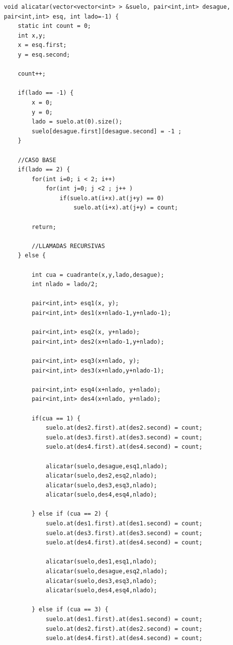 \begin{lstlisting}
void alicatar(vector<vector<int> > &suelo, pair<int,int> desague, pair<int,int> esq, int lado=-1) {
    static int count = 0;
    int x,y;
    x = esq.first;
    y = esq.second;

    count++;

    if(lado == -1) {
        x = 0;
        y = 0;
        lado = suelo.at(0).size();
        suelo[desague.first][desague.second] = -1 ;
    }

    //CASO BASE
    if(lado == 2) {
        for(int i=0; i < 2; i++)
            for(int j=0; j <2 ; j++ )
                if(suelo.at(i+x).at(j+y) == 0)
                    suelo.at(i+x).at(j+y) = count;

        return;

        //LLAMADAS RECURSIVAS
    } else {

        int cua = cuadrante(x,y,lado,desague);
        int nlado = lado/2;

        pair<int,int> esq1(x, y);
        pair<int,int> des1(x+nlado-1,y+nlado-1);

        pair<int,int> esq2(x, y+nlado);
        pair<int,int> des2(x+nlado-1,y+nlado);

        pair<int,int> esq3(x+nlado, y);
        pair<int,int> des3(x+nlado,y+nlado-1);

        pair<int,int> esq4(x+nlado, y+nlado);
        pair<int,int> des4(x+nlado, y+nlado);

        if(cua == 1) {
            suelo.at(des2.first).at(des2.second) = count;
            suelo.at(des3.first).at(des3.second) = count;
            suelo.at(des4.first).at(des4.second) = count;

            alicatar(suelo,desague,esq1,nlado);
            alicatar(suelo,des2,esq2,nlado);
            alicatar(suelo,des3,esq3,nlado);
            alicatar(suelo,des4,esq4,nlado);

        } else if (cua == 2) {
            suelo.at(des1.first).at(des1.second) = count;
            suelo.at(des3.first).at(des3.second) = count;
            suelo.at(des4.first).at(des4.second) = count;

            alicatar(suelo,des1,esq1,nlado);
            alicatar(suelo,desague,esq2,nlado);
            alicatar(suelo,des3,esq3,nlado);
            alicatar(suelo,des4,esq4,nlado);

        } else if (cua == 3) {
            suelo.at(des1.first).at(des1.second) = count;
            suelo.at(des2.first).at(des2.second) = count;
            suelo.at(des4.first).at(des4.second) = count;


\end{lstlisting}
